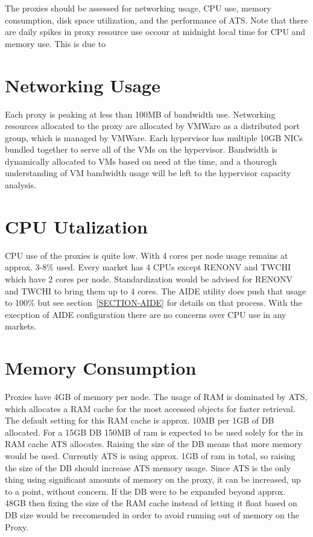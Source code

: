 \documentclass{article}
\begin{document}
The proxies should be assessed for networking usage, CPU use, memory consumption, disk space utilization, and the performance of ATS. Note that there are daily spikes in proxy resource use occour at midnight local time for CPU and memory use. This is due to 



\section{Networking Usage}
\label{SECTION-Networking}

Each proxy is peaking at less than 100MB of bandwidth use. Networking resources allocated to the proxy are allocated by VMWare as a distributed port group, which is managed by VMWare. Each hypervisor has multiple 10GB NICs bundled together to serve all of the VMs on the hypervisor. Bandwidth is dynamically allocated to VMs based on need at the time, and a thourogh understanding of VM bandwidth usage will be left to the hypervisor capacity analysis. 



\section{CPU Utalization}
\label{SECTION-CPUUse}

CPU use of the proxies is quite low. With 4 cores per node usage remains at approx. 3-8\% used. Every market has 4 CPUs except RENONV and TWCHI which have 2 cores per node. Standardization would be advised for RENONV and TWCHI to bring them up to 4 cores. The AIDE utility does push that usage to 100\% but see section~\ref{SECTION-AIDE} for details on that process. With the execption of AIDE configuration there are no concerns over CPU use in any markets. 



\section{Memory Consumption}
\label{SECTION-Memory}

Proxies have 4GB of memory per node. The usage of RAM is dominated by ATS, which allocates a RAM cache for the most accessed objects for faster retrieval. The default setting for this RAM cache is approx. 10MB per 1GB of DB allocated. For a 15GB DB 150MB of ram is expected to be used solely for the in RAM cache ATS allocates. Raising the size of the DB means that more memory would be used. Currently ATS is using approx. 1GB of ram in total, so raising the size of the DB should increase ATS memory usage. Since ATS is the only thing using significant amounts of memory on the proxy, it can be increased, up to a point, without concern. If the DB were to be expanded beyond approx. 48GB then fixing the size of the RAM cache instead of letting it float based on DB size would be reccomended in order to avoid running out of memory on the Proxy.
\end{document}
